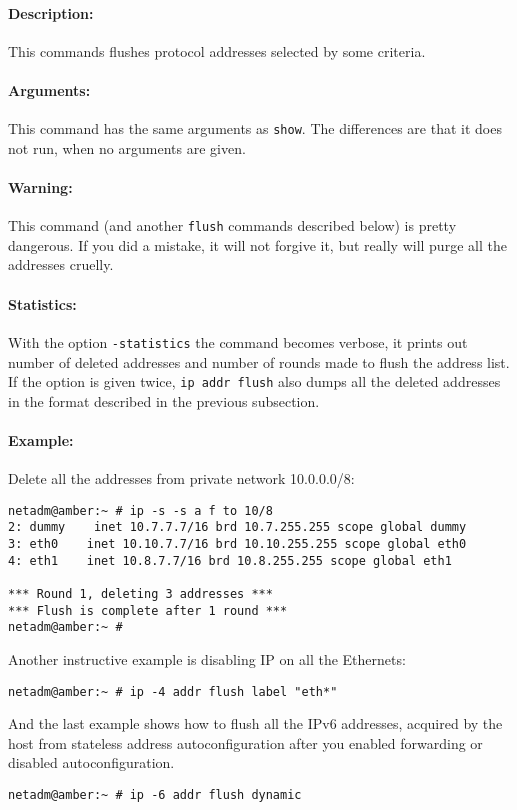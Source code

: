 \paragraph{Description:}This commands flushes protocol addresses
selected by some criteria.

\paragraph{Arguments:} This command has the same arguments as \verb|show|.
The differences are that it does not run, when no arguments are given.

\paragraph{Warning:} This command (and another \verb|flush| commands
described below) is pretty dangerous. If you did a mistake, it will
not forgive it, but really will purge all the addresses cruelly.

\paragraph{Statistics:} With the option \verb|-statistics| the command
becomes verbose, it prints out number of deleted addresses and number
of rounds made to flush the address list. If the option is given
twice, \verb|ip addr flush| also dumps all the deleted addresses
in the format described in the previous subsection.

\paragraph{Example:} Delete all the addresses from private network
10.0.0.0/8:
\begin{verbatim}
netadm@amber:~ # ip -s -s a f to 10/8
2: dummy    inet 10.7.7.7/16 brd 10.7.255.255 scope global dummy
3: eth0    inet 10.10.7.7/16 brd 10.10.255.255 scope global eth0
4: eth1    inet 10.8.7.7/16 brd 10.8.255.255 scope global eth1

*** Round 1, deleting 3 addresses ***
*** Flush is complete after 1 round ***
netadm@amber:~ # 
\end{verbatim}
Another instructive example is disabling IP on all the Ethernets:
\begin{verbatim}
netadm@amber:~ # ip -4 addr flush label "eth*"
\end{verbatim}
And the last example shows how to flush all the IPv6 addresses,
acquired by the host from stateless address autoconfiguration
after you enabled forwarding or disabled autoconfiguration.
\begin{verbatim}
netadm@amber:~ # ip -6 addr flush dynamic
\end{verbatim}



